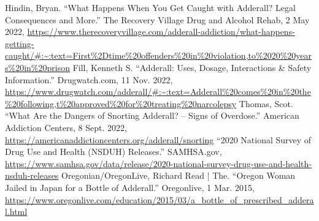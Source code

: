 \documentclass{article}
\begin{document}
\begin{thebibliography}{}
                Hindin, Bryan. “What Happens When You Get Caught with Adderall? Legal Consequences and More.” The Recovery Village Drug and Alcohol Rehab, 2 May 2022, \url{https://www.therecoveryvillage.com/adderall-addiction/what-happens-getting-caught/#:~:text=First%2Dtime%20offenders%20in%20violation,to%2020%20years%20in%20prison}
                 Fill, Kenneth S. “Adderall: Uses, Dosage, Interactions \& Safety Information.” Drugwatch.com, 11 Nov. 2022, \url{https://www.drugwatch.com/adderall/#:~:text=Adderall%20comes%20in%20the%20following,t%20approved%20for%20treating%20narcolepsy}
                Thomas, Scot. “What Are the Dangers of Snorting Adderall? – Signs of Overdose.” American Addiction Centers, 8 Sept. 2022, \url{https://americanaddictioncenters.org/adderall/snorting}
                “2020 National Survey of Drug Use and Health (NSDUH) Releases.” SAMHSA.gov, \url{https://www.samhsa.gov/data/release/2020-national-survey-drug-use-and-health-nsduh-releases}
                Oregonian/OregonLive, Richard Read | The. “Oregon Woman Jailed in Japan for a Bottle of Adderall.” Oregonlive, 1 Mar. 2015, \url{https://www.oregonlive.com/education/2015/03/a_bottle_of_prescribed_adderal.html} 
        \end{thebibliography}
        
        
\end{document}
